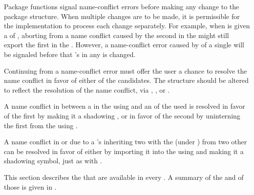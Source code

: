 
  \itemitem{--} 
  Package functions signal name-conflict errors  before making any
  change to the package structure.  When multiple changes are to be made,
  it is
  permissible for the implementation to process each change separately.
  For example, when  is given a 
 of 
,
  aborting from a name
  conflict caused by the second  
  in the  might still export the
  first  in the .  
  However, a name-conflict error caused by 
  of a single  will be signaled before
  that 's  in any  is changed.

\itemitem{--} 
Continuing from a name-conflict error must offer the user a chance to
resolve the name conflict in favor of either of the candidates.  The
structure should be altered to reflect the resolution of the
name conflict, via , 
,
or .

\itemitem{--} 
A name conflict in  between a  
 in the using  and an  of the used 
 is resolved in favor of the first  by making it a
shadowing , or in favor of the second  by uninterning
the first  from the using . 

\itemitem{--} 
A name conflict in  or  
due to a 's inheriting two   
with the   (under )
from two other  can be resolved in
favor of either  by importing it into the using
 and making it a shadowing symbol, just as with
.
\endlist

\endsubsubsubsection%

\endsubsubsection%

\endsubSection%


This section describes the  that are available
in every .  A summary of the
 and  of those   
is given in \thenextfigure.


